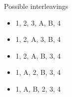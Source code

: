 \documentclass{beamer}\mode<presentation>{\usetheme{AMSBolognaFC}}
\begin{document}
\begin{frame}[allowframebreaks]
    \begin{exampleblock}{Possible interleavings}
        \begin{multicols}{3}
            \begin{itemize}
                \item 1, 2, 3, A, B, 4
                \item 1, 2, A, 3, B, 4
                \item 1, 2, A, B, 3, 4
                \item 1, A, 2, B, 3, 4
                \item 1, A, B, 2, 3, 4
            \end{itemize}
        \end{multicols}
    \end{exampleblock}


%    

\end{frame}
\end{document}
